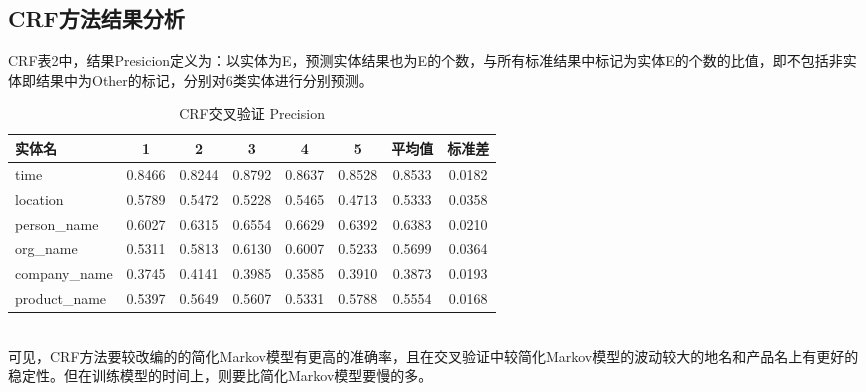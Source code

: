 \documentclass[11pt]{article}
\begin{document}
\subsection{CRF方法结果分析}
\hspace{1.6em} CRF表2中，结果Presicion定义为：以实体为E，预测实体结果也为E的个数，与所有标准结果中标记为实体E的个数的比值，即不包括非实体即结果中为Other的标记，分别对6类实体进行分别预测。
\begin{table}[htbp]
\setlength{\belowcaptionskip}{10pt}
\caption{CRF交叉验证 Precision}
\centering
\begin{tabular}{|l|c|c|c|c|c|c|c|}
\hline
实体名 & 1 & 2 & 3 & 4 & 5 & 平均值 & 标准差\\ \hline
time&   0.8466&	0.8244&	0.8792&	0.8637&	0.8528& 0.8533& 0.0182 \\ \hline
location&	0.5789&	0.5472&	0.5228&	0.5465&	0.4713& 0.5333& 0.0358 \\ \hline
person\_name&	0.6027&	0.6315&	0.6554&	0.6629&	0.6392& 0.6383& 0.0210 \\ \hline
org\_name&	0.5311&	0.5813&	0.6130&	0.6007&	0.5233& 0.5699& 0.0364 \\ \hline
company\_name&	0.3745&	0.4141&	0.3985&	0.3585&	0.3910& 0.3873& 0.0193 \\ \hline
product\_name&	0.5397&	0.5649&	0.5607&	0.5331&	0.5788& 0.5554& 0.0168 \\  \hline
\end{tabular}
\end{table} \\
\indent 可见，CRF方法要较改编的的简化Markov模型有更高的准确率，且在交叉验证中较简化Markov模型的波动较大的地名和产品名上有更好的稳定性。但在训练模型的时间上，则要比简化Markov模型要慢的多。
\end{document}
